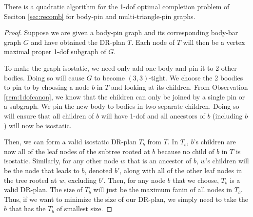 \begin{figure}
\end{figure}

\begin{theorem}
\label{thm:1dofcase}
    There is a quadratic algorithm for the 1-dof optimal completion problem of Seciton \ref{sec:recomb} for body-pin and multi-triangle-pin graphs.
\end{theorem}

\begin{proof}
    Suppose we are given a body-pin graph and its corresponding body-bar graph $G$ and have obtained the DR-plan $T$. Each node of $T$ will then be a vertex maximal proper 1-dof subgraph of $G$. 

    To make the graph isostatic, we need only add one body and pin it to 2 other bodies. Doing so will cause $G$ to become $(3,3)$-tight. We choose the 2 boodies to pin to by choosing a node $b$ in $T$ and looking at its children. From Observation \ref{rem:1dofcanon}, we know that the children can only be joined by a single pin or a subgraph. We pin the new body to bodies in two separate children. Doing so will ensure that all children of $b$ will have 1-dof and all ancestors of $b$ (including $b$) will now be isostatic. 


    Then, we can form a valid isostatic DR-plan $T_b$ from $T$. In $T_b$, $b$'s children are now all of the leaf nodes of the subtree rooted at $b$ because no child of $b$ in $T$ is isostatic. Similarly, for any other node $w$ that is an ancestor of $b$, $w$'s children will be the node that leads to $b$, denoted $b'$, along with all of the other leaf nodes in the tree rooted at $w$, excluding $b'$. Then, for any node $b$ that we choose, $T_b$ is a valid DR-plan. The size of $T_b$ will just be the maximum fanin of all nodes in $T_b$. Thus, if we want to minimize the size of our DR-plan, we simply need to take the $b$ that has the $T_b$ of smallest size. 


\end{proof}
